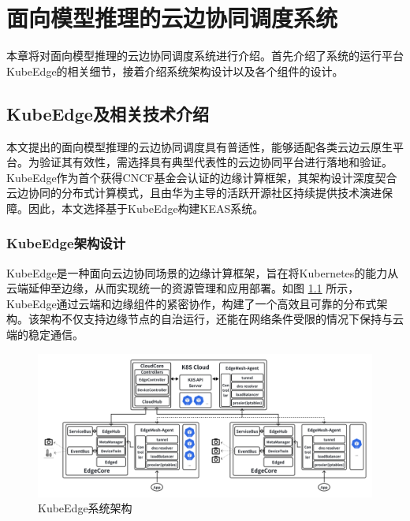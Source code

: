 \chapter{面向模型推理的云边协同调度系统}

本章将对面向模型推理的云边协同调度系统进行介绍。首先介绍了系统的运行平台KubeEdge的相关细节，接着介绍系统架构设计以及各个组件的设计。

\section{KubeEdge及相关技术介绍}

本文提出的面向模型推理的云边协同调度具有普适性，能够适配各类云边云原生平台。为验证其有效性，需选择具有典型代表性的云边协同平台进行落地和验证。KubeEdge作为首个获得CNCF基金会认证的边缘计算框架，其架构设计深度契合云边协同的分布式计算模式，且由华为主导的活跃开源社区持续提供技术演进保障。因此，本文选择基于KubeEdge构建KEAS系统。

\subsection{KubeEdge架构设计}

KubeEdge是一种面向云边协同场景的边缘计算框架，旨在将Kubernetes的能力从云端延伸至边缘，从而实现统一的资源管理和应用部署。如图 \ref{fig:4-1kubeedge} 所示，KubeEdge通过云端和边缘组件的紧密协作，构建了一个高效且可靠的分布式架构。该架构不仅支持边缘节点的自治运行，还能在网络条件受限的情况下保持与云端的稳定通信。

\begin{figure}[ht]
  \centering
  \includegraphics[width=\textwidth]{pics/4-1kubeedge.png}
  \caption{KubeEdge系统架构\cite{xiong2018extend}}
  \label{fig:4-1kubeedge}
\end{figure}



